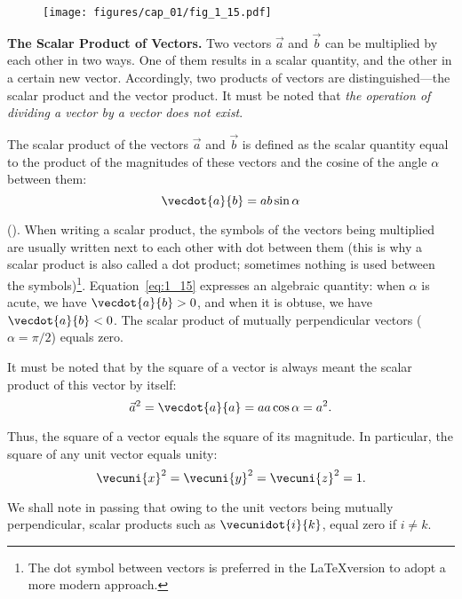 \begin{figure}[t]
	\begin{center}
		\texttt{[image: figures/cap\_01/fig\_1\_15.pdf]}
		\caption[]{}
		\label{fig:1_15}
	\end{center}
	\vspace{-1.0cm}
\end{figure}

\textbf{The Scalar Product of Vectors.} Two vectors $\vec{a}$ and $\vec{b}$ can be multiplied by each other in two ways. One of them results in a scalar quantity, and the other in a certain new vector. Accordingly, two products of vectors are distinguished---the scalar product and the vector product. It must be noted that \textit{the operation of dividing a vector by a vector does not exist}.

The scalar product of the vectors $\vec{a}$ and $\vec{b}$ is defined as the scalar quantity equal to the product of the magnitudes of these vectors and the cosine of the angle $\alpha$ between them:
\begin{equation}\label{eq:1_15}
\vecdot{a}{b} = ab\sin\alpha
\end{equation}

\noindent
(). When writing a scalar product, the symbols of the vectors being multiplied are usually written next to each other with dot between them (this is why a scalar product is also called a dot product; sometimes nothing is used between the symbols)\footnote{The dot symbol between vectors is preferred in the \LaTeX version to adopt a more modern approach.}. Equation~\eqref{eq:1_15} expresses an algebraic quantity: when $\alpha$ is acute, we have $\vecdot{a}{b}>0$, and when it is obtuse, we have $\vecdot{a}{b}<0$. The scalar product of mutually perpendicular vectors ($\alpha=\pi/2$) equals zero.

It must be noted that by the square of a vector is always meant the scalar product of this vector by itself:
\begin{equation}\label{eq:1_16}
\vec{a}^2 = \vecdot{a}{a} = aa\cos\alpha = a^2.
\end{equation}

\noindent
Thus, the square of a vector equals the square of its magnitude. In particular, the square of any unit vector equals unity:
\begin{equation}\label{eq:1_17}
\vecuni{x}^2 = \vecuni{y}^2 = \vecuni{z}^2 = 1.
\end{equation}

\noindent
We shall note in passing that owing to the unit vectors being mutually perpendicular, scalar products such as $\vecunidot{i}{k}$, equal zero if $i\neq k$.

